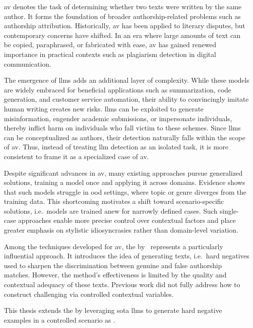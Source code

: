 \Acf{av} denotes the task of determining whether two texts were written by the same author. 
It forms the foundation of broader authorship-related problems such as authorship attribution. 
Historically, \ac{av} has been applied to literary disputes, but contemporary concerns have shifted. 
In an era where large amounts of text can be copied, paraphrased, or fabricated with ease, \ac{av} has gained renewed importance in practical contexts such as plagiarism detection in digital communication.

The emergence of \acp{llm} adds an additional layer of complexity. 
While these models are widely embraced for beneficial applications such as summarization, code generation, and customer service automation, their ability to convincingly imitate human writing creates new risks. 
\acp{llm} can be exploited to generate misinformation, engender academic submissions, or impersonate individuals, thereby inflict harm on individuals who fall victim to these schemes. 
Since \acp{llm} can be conceptualized as authors, their detection naturally falls within the scope of \ac{av}. 
Thus, instead of treating \ac{llm} detection as an isolated task, it is more consistent to frame it as a specialized case of \ac{av}.

Despite significant advances in \ac{av}, many existing approaches pursue generalized solutions, training a model once and applying it across domains. 
Evidence shows that such models struggle in \ac{ood} settings, where topic or genre diverges from the training data. 
This shortcoming motivates a shift toward scenario-specific solutions, i.e.\ models are trained anew for narrowly defined cases. 
Such single-case approaches enable more precise control over contextual factors and place greater emphasis on stylistic idiosyncrasies rather than domain-level variation.

Among the techniques developed for \ac{av}, the \impAppr{} by \citet{koppel_determining_2014}\ represents a particularly influential approach. 
It introduces the idea of generating \imp{} texts, i.e.\ hard negatives used to sharpen the discrimination between genuine and false authorship matches. 
However, the method's effectiveness is limited by the quality and contextual adequacy of these \imp{} texts. 
Previous work did not fully address how to construct challenging \imps{} via controlled contextual variables.

This thesis extends the \impAppr{} by leveraging \acl{sota} \acp{llm} to generate hard negative examples in a controlled scenario as \imps{}. 

